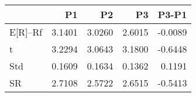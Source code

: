 \begin{tabular}{lrrrr}
\toprule
 & P1 & P2 & P3 & P3-P1 \\
\midrule
E[R]--Rf & 3.1401 & 3.0260 & 2.6015 & -0.0089 \\
t & 3.2294 & 3.0643 & 3.1800 & -0.6448 \\
Std & 0.1609 & 0.1634 & 0.1362 & 0.1191 \\
SR & 2.7108 & 2.5722 & 2.6515 & -0.5413 \\
\bottomrule
\end{tabular}
